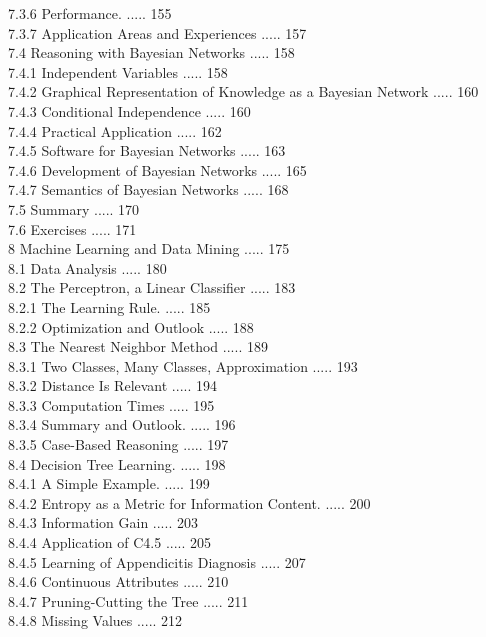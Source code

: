 \documentclass[10pt]{article}
\begin{document}
7.3.6 Performance. ..... 155\\
7.3.7 Application Areas and Experiences ..... 157\\
7.4 Reasoning with Bayesian Networks ..... 158\\
7.4.1 Independent Variables ..... 158\\
7.4.2 Graphical Representation of Knowledge as a Bayesian Network ..... 160\\
7.4.3 Conditional Independence ..... 160\\
7.4.4 Practical Application ..... 162\\
7.4.5 Software for Bayesian Networks ..... 163\\
7.4.6 Development of Bayesian Networks ..... 165\\
7.4.7 Semantics of Bayesian Networks ..... 168\\
7.5 Summary ..... 170\\
7.6 Exercises ..... 171\\
8 Machine Learning and Data Mining ..... 175\\
8.1 Data Analysis ..... 180\\
8.2 The Perceptron, a Linear Classifier ..... 183\\
8.2.1 The Learning Rule. ..... 185\\
8.2.2 Optimization and Outlook ..... 188\\
8.3 The Nearest Neighbor Method ..... 189\\
8.3.1 Two Classes, Many Classes, Approximation ..... 193\\
8.3.2 Distance Is Relevant ..... 194\\
8.3.3 Computation Times ..... 195\\
8.3.4 Summary and Outlook. ..... 196\\
8.3.5 Case-Based Reasoning ..... 197\\
8.4 Decision Tree Learning. ..... 198\\
8.4.1 A Simple Example. ..... 199\\
8.4.2 Entropy as a Metric for Information Content. ..... 200\\
8.4.3 Information Gain ..... 203\\
8.4.4 Application of C4.5 ..... 205\\
8.4.5 Learning of Appendicitis Diagnosis ..... 207\\
8.4.6 Continuous Attributes ..... 210\\
8.4.7 Pruning-Cutting the Tree ..... 211\\
8.4.8 Missing Values ..... 212\\
\end{document}
